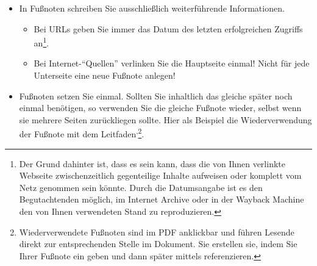 \begin{itemize}
{        Insbesondere im Hauptteil der Ausarbeitung --\,in der Regel aber im gesamten Dokument\,-- referenzieren Sie die Quellen im Fließtext/Lauftext indem Sie auf den zitierten Autor\footnote{Das machen Sie mit dem Zitationsstil \enquote{unsrtnat} und der Anweisung .} oder die Referenz (z.B.\cite{bentley:1999}\footnote{Das hier ist ein spezieller Zitationsstil (\enquote{baalphadin}) für die Berufsakademie, welcher auf dem alphanummerischen DIN-Stil (\enquote{alphadin}) beruht. Sie können aber auch jeden anderen Stil verwenden, solange Sie eindeutig bleiben und nicht zwischen Stilen hin-und-her wechseln. Eine Liste mit Stilen finden Sie in der Overleaf-Hilfe: \url{https://www.overleaf.com/learn/latex/bibtex_bibliography_styles}}) im Quellenverzeichnis verweisen. {\color{red}In den Ingenieurwissenschaften gehören Quellenangaben auf keinen Fall in  Fußnoten!} Das bemerken Sie allein schon an den üblichen Zitierstilen aller großen Outlets, welche in den Ingenieur- und Naturwissenschaften verwendet werden: ACM, APA, CSE, DIN ISO 690 (Vancouver), IEEE, LNI, Springer, etc.\,pp.
    }
    \item{
        In Fußnoten schreiben Sie ausschließlich weiterführende Informationen.
        \begin{itemize}
            \item Bei URLs geben Sie immer das Datum des letzten erfolgreichen Zugriffs an\footnote{Der Grund dahinter ist, dass es sein kann, dass die von Ihnen verlinkte Webseite zwischenzeitlich gegenteilige Inhalte aufweisen oder komplett vom Netz genommen sein könnte. Durch die Datumsangabe ist es den Begutachtenden möglich, im Internet Archive oder in der Wayback Machine den von Ihnen verwendeten Stand zu reproduzieren.}.
            \item Bei Internet-\enquote{Quellen} verlinken Sie die Hauptseite einmal! Nicht für jede Unterseite eine neue Fußnote anlegen!
        \end{itemize}
    }
    \item{
        Fußnoten setzen Sie einmal. Sollten Sie inhaltlich das gleiche später noch einmal benötigen, so verwenden Sie die gleiche Fußnote wieder, selbst wenn sie mehrere Seiten zurückliegen sollte. Hier als Beispiel die Wiederverwendung der Fußnote mit dem Leitfaden\textsuperscript{,}\footnote{Wiederverwendete Fußnoten sind im PDF anklickbar und führen Lesende direkt zur entsprechenden Stelle im Dokument. Sie erstellen sie, indem Sie Ihrer Fußnote ein  geben und dann später mittels  referenzieren.}.
    }
\end{itemize}

